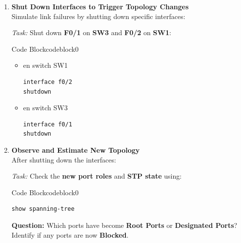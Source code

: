 \documentclass[a4paper]{book}
\begin{document}
\begin{enumerate}
\begin{ocg}{Code Block}{codeblock}{0}
	      \end{ocg}

	\item \textbf{Shut Down Interfaces to Trigger Topology Changes} \\
	      Simulate link failures by shutting down specific interfaces:

	      \textit{Task:} Shut down \textbf{F0/1} on \textbf{SW3} and \textbf{F0/2} on \textbf{SW1}:



	      \begin{ocg}{Code Block}{codeblock}{0}
		      \vspace{0.5cm}
		      \begin{itemize}
			      \item en switch SW1
			            \begin{lstlisting}
interface f0/2
shutdown
                \end{lstlisting}
			      \item en switch SW3
			            \begin{lstlisting}
interface f0/1
shutdown
                \end{lstlisting}
		      \end{itemize}
	      \end{ocg}
	\item \textbf{Observe and Estimate New Topology} \\
	      After shutting down the interfaces:

	      \textit{Task:} Check the \textbf{new port roles} and \textbf{STP state} using:



	      \begin{ocg}{Code Block}{codeblock}{0}
		      \vspace{0.5cm}
		      \begin{lstlisting}
show spanning-tree
                \end{lstlisting}
	      \end{ocg}

	      \textbf{Question:} Which ports have become \textbf{Root Ports} or \textbf{Designated Ports}? Identify if any ports are now \textbf{Blocked}.


\end{enumerate}
\end{document}
